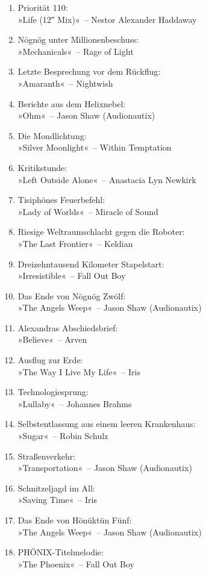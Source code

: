 \begin{enumerate}
    \item Priorität 110:\\ »Life (12″ Mix)«~– Nestor Alexander Haddaway
    \item Nögnög unter Millionenbeschuss:\\ »Mechanicals«~– Rage of Light
    \item Letzte Besprechung vor dem Rückflug:\\ »Amaranth«~– Nightwish
    \item Berichte aus dem Helixnebel:\\ »Ohm«~– Jason Shaw (Audionautix)
    \item Die Mondlichtung:\\ »Silver Moonlight«~– Within Temptation
    \item Kritikstunde:\\ »Left Outside Alone«~– Anastacia Lyn Newkirk
    \item Tisiphönes Feuerbefehl:\\ »Lady of Worlds«~– Miracle of Sound
    \item Riesige Weltraumschlacht gegen die Roboter:\\ »The Last Frontier«~– Keldian
    \item Dreizehntausend Kilometer Stapelstart:\\ »Irresistible«~– Fall Out Boy
    \item Das Ende von Nögnög Zwölf:\\ »The Angels Weep«~– Jason Shaw (Audionautix)
    \item Alexandras Abschiedsbrief:\\ »Believe«~– Arven
    \item Ausflug zur Erde:\\ »The Way I Live My Life«~– Iris
    \item Technologiesprung:\\ »Lullaby«~– Johannes Brahms
    \item Selbstentlassung aus einem leeren Krankenhaus:\\ »Sugar«~– Robin Schulz
    \item Straßenverkehr:\\ »Transportation«~– Jason Shaw (Audionautix)
    \item Schnitzeljagd im All:\\ »Saving Time«~– Iris
    \item Das Ende von Hönüktün Fünf:\\ »The Angels Weep«~– Jason Shaw (Audionautix)
    \item PHÖNIX-Titelmelodie:\\ »The Phoenix«~– Fall Out Boy

\end{enumerate}
